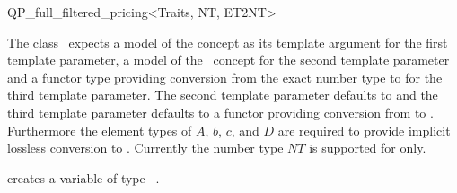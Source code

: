 \begin{ccRefClass}{QP_full_filtered_pricing<Traits, NT, ET2NT>}

\ccInheritsFrom
{}

\ccRequirements
\ccIndexRequirements

The class \ccRefName\ expects a model of the concept
 as its template argument for the first template parameter,
a model of the \cgal\ concept  for the second template
parameter and a functor type
providing conversion from the exact number type  to 
for the third template parameter. The second template parameter defaults to
 and the third template parameter defaults to a functor providing
conversion from  to . Furthermore the element types
of $A$, $b$, $c$, and $D$ are required to provide implicit lossless conversion
to . Currently the number type $NT$ is supported for  only.  


\ccTypes \ccIndexClassTypes


\ccCreation
\ccIndexClassCreation
{}

{creates a variable of type \ccRefName\ .}


\ccUnchecked

\ccAccessFunctions
\begin{ccIndexMemberFunctions}




\ccModifiers
{}





\end{ccIndexMemberFunctions}

\ccSeeAlso
%


\end{ccRefClass}
